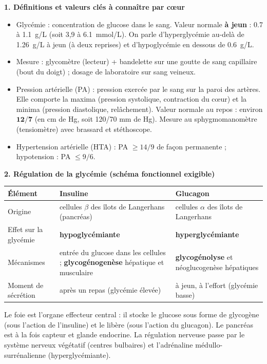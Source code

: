 \documentclass[11pt]{article}
\newcommand{\cle}[1]{{\popxbold\color{popdark}#1}}
\begin{document}
\begin{bilan}
\textbf{1. Définitions et valeurs clés à connaître par c\oe ur}
\begin{itemize}
  \item \cle{Glycémie} : concentration de glucose dans le sang. Valeur normale \textbf{à jeun} : \num{0,7} à \SI{1,1}{g/L} (soit 3,9 à \SI{6,1}{mmol/L}). On parle d'\cle{hyperglycémie} au-delà de \SI{1,26}{g/L} à jeun (à deux reprises) et d'\cle{hypoglycémie} en dessous de \SI{0,6}{g/L}.
  \item Mesure : \cle{glycomètre} (lecteur) + bandelette sur une goutte de sang capillaire (bout du doigt) ; dosage de laboratoire sur sang veineux.
  \item \cle{Pression artérielle} (PA) : pression exercée par le sang sur la paroi des artères. Elle comporte la \cle{maxima} (pression systolique, contraction du c\oe ur) et la \cle{minima} (pression diastolique, relâchement). Valeur normale au repos : environ $\mathbf{12/7}$ (en cm de Hg, soit 120/70 mm de Hg). Mesure au \cle{sphygmomanomètre} (tensiomètre) avec brassard et stéthoscope.
  \item \cle{Hypertension artérielle} (HTA) : PA $\geq 14/9$ de façon permanente ; \cle{hypotension} : PA $\leq 9/6$.
\end{itemize}

\textbf{2. Régulation de la glycémie (schéma fonctionnel exigible)}
\begin{center}
\begin{tabularx}{\linewidth}{|l|X|X|}
\hline
\rowcolor{popblueL} \textbf{Élément} & \textbf{Insuline} & \textbf{Glucagon} \\
\hline
Origine & cellules $\beta$ des îlots de Langerhans (pancréas) & cellules $\alpha$ des îlots de Langerhans \\
\hline
Effet sur la glycémie & \textbf{hypoglycémiante} & \textbf{hyperglycémiante} \\
\hline
Mécanismes & entrée du glucose dans les cellules ; \textbf{glycogénogenèse} hépatique et musculaire & \textbf{glycogénolyse} et néoglucogenèse hépatiques \\
\hline
Moment de sécrétion & après un repas (glycémie élevée) & à jeun, à l'effort (glycémie basse) \\
\hline
\end{tabularx}
\end{center}
Le \cle{foie} est l'organe effecteur central : il stocke le glucose sous forme de glycogène (sous l'action de l'insuline) et le libère (sous l'action du glucagon). Le \cle{pancréas} est à la fois capteur et glande endocrine. La régulation nerveuse passe par le \cle{système nerveux végétatif} (centres bulbaires) et l'\cle{adrénaline} médullo-surrénalienne (hyperglycémiante).


\end{bilan}
\end{document}
